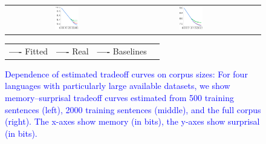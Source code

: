 \documentclass[11pt,letterpaper]{article}
\begin{document}
\begin{figure}
\begin{centering}
\begin{tabular}{ccc}
		\includegraphics[width=0.2\textwidth]{figures/Russian_2000-listener-surprisal-memory-MEDIANS_onlyWordForms_boundedVocab.pdf} &
\includegraphics[width=0.2\textwidth]{figures/Russian-listener-surprisal-memory-MEDIANS_onlyWordForms_boundedVocab.pdf}
	\end{tabular}

		\begin{tabular}{llll}
\textbf{\textcolor{fitted}{----}} Fitted&
\textbf{\textcolor{real}{----}} Real&
\textbf{\textcolor{baseline}{----}} Baselines&
\end{tabular}

	\end{centering}
	\caption{\textcolor{blue}{Dependence of estimated tradeoff curves on corpus sizes: For four languages with particularly large available datasets, we show memory--surprisal tradeoff curves estimated from 500 training sentences (left), 2000 training sentences (middle), and the full corpus (right). The x-axes show memory (in bits), the y-axes show surprisal (in bits).}}\label{fig:size-dependence}
\end{figure}
\end{document}

